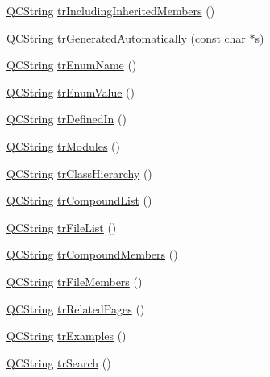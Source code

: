 \begin{DoxyCompactItemize}
\item 
\hyperlink{class_q_c_string}{Q\+C\+String} \hyperlink{class_translator_dutch_a37fa67d80c65b0758ec17480e45efc6d}{tr\+Including\+Inherited\+Members} ()
\item 
\hyperlink{class_q_c_string}{Q\+C\+String} \hyperlink{class_translator_dutch_a39f064b2ff129d2ef9d0094312bb3142}{tr\+Generated\+Automatically} (const char $\ast$\hyperlink{060__command__switch_8tcl_a011c73f2dbb87635a3b4206c72355f6e}{s})
\item 
\hyperlink{class_q_c_string}{Q\+C\+String} \hyperlink{class_translator_dutch_a77a7c2683f7109432e21a71dab6a377a}{tr\+Enum\+Name} ()
\item 
\hyperlink{class_q_c_string}{Q\+C\+String} \hyperlink{class_translator_dutch_a5a7be650bcbef01eea37d960460accf0}{tr\+Enum\+Value} ()
\item 
\hyperlink{class_q_c_string}{Q\+C\+String} \hyperlink{class_translator_dutch_a799450c2a6d07d61ae9646baff5e730a}{tr\+Defined\+In} ()
\item 
\hyperlink{class_q_c_string}{Q\+C\+String} \hyperlink{class_translator_dutch_a1acad1e7377911da0f39a4be44362a5e}{tr\+Modules} ()
\item 
\hyperlink{class_q_c_string}{Q\+C\+String} \hyperlink{class_translator_dutch_ad370a7f7f9be0cfa2f9de24e737492ac}{tr\+Class\+Hierarchy} ()
\item 
\hyperlink{class_q_c_string}{Q\+C\+String} \hyperlink{class_translator_dutch_a0c1d024ff5cdb6be37e4a0e11c3ee167}{tr\+Compound\+List} ()
\item 
\hyperlink{class_q_c_string}{Q\+C\+String} \hyperlink{class_translator_dutch_a9a310603a6ff853c1b55e4c4c918e212}{tr\+File\+List} ()
\item 
\hyperlink{class_q_c_string}{Q\+C\+String} \hyperlink{class_translator_dutch_a592546d7cafc6544fa0bbbc2b9ea520e}{tr\+Compound\+Members} ()
\item 
\hyperlink{class_q_c_string}{Q\+C\+String} \hyperlink{class_translator_dutch_a55fde4524274d0b602075631c0e47252}{tr\+File\+Members} ()
\item 
\hyperlink{class_q_c_string}{Q\+C\+String} \hyperlink{class_translator_dutch_a6de3ccbf8b3beaf43b9bd4292717acc4}{tr\+Related\+Pages} ()
\item 
\hyperlink{class_q_c_string}{Q\+C\+String} \hyperlink{class_translator_dutch_a04ffe6274051391efd8ed2666d73a21c}{tr\+Examples} ()
\item 
\hyperlink{class_q_c_string}{Q\+C\+String} \hyperlink{class_translator_dutch_a8b72d760222466784ebb60c0cafe621f}{tr\+Search} ()

\end{DoxyCompactItemize}
